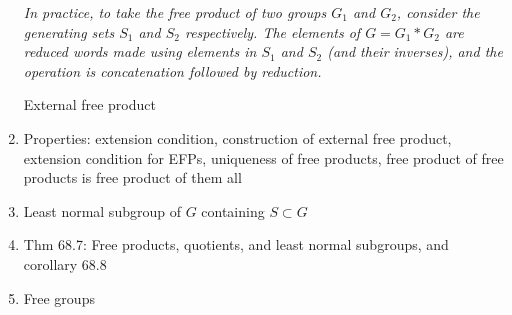 \documentclass[letterpaper, 12pt]{article}
\begin{document}
\begin{enumerate}[resume]
{            \textit{In practice, to take the free product of two groups $G_1$ and $G_2$, consider the generating sets $S_1$ and $S_2$ respectively. The elements of $G = G_1 * G_2$ are reduced words made using elements in $S_1$ and $S_2$ (and their inverses), and the operation is concatenation followed by reduction.}}

            External free product
            \item Properties: extension condition, construction of external free product, extension condition for EFPs, uniqueness of free products, free product of free products is free product of them all
            \item Least normal subgroup of $G$ containing $S\subset G$
            \item Thm 68.7: Free products, quotients, and least normal subgroups, and corollary 68.8
            \item Free groups
        \end{enumerate}
\end{document}
